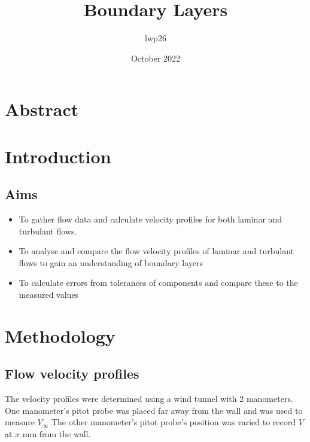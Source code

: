 \documentclass{article}
\begin{document}
\title{Boundary Layers}
\author{lwp26 }
\date{October 2022}
\maketitle

\section{Abstract}

\section{Introduction}


\subsection{Aims}

\begin{itemize}
\item To gather flow data and calculate velocity profiles for both laminar and turbulant flows.
\item To analyse and compare the flow velocity profiles of laminar and turbulant flows to gain an understanding of boundary layers
\item To calculate errors from tolerances of components and compare these to the measured values
\end{itemize}

\section{Methodology}

\subsection{Flow velocity profiles}
The velocity profiles were determined using a wind tunnel with 2 manometers. One manometer's pitot probe was placed far away from the wall and was used to measure $V_\infty$ The other manometer's pitot probe's position was varied to record $V$ at $x$ mm from the wall.
\end{document}
